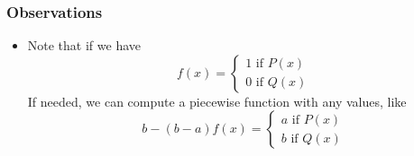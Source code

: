 \subsubsection*{Observations}

\begin{itemize}
	\item Note that if we have
	\[
  			f(x)=\begin{cases}
               1 \text{ if } P(x) \\
               0 \text{ if } Q(x)
            \end{cases}
		\]
		If needed, we can compute a piecewise function with any values, like 
		\[
  			b - (b - a)f(x)=\begin{cases}
               a \text{ if } P(x) \\
               b \text{ if } Q(x)
            \end{cases}
		\]
		
\end{itemize}
\label{sec:iteration}